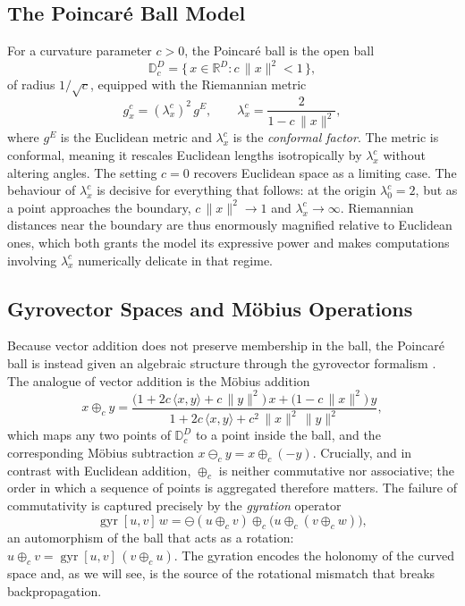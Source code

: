\documentclass[12pt]{report}
\begin{document}
\subsection{The Poincar\'e Ball Model}
For a curvature parameter $c > 0$, the Poincar\'e ball is the open ball
\begin{equation}
    \mathbb{D}_c^D = \big\{\, x \in \mathbb{R}^D : c\,\|x\|^2 < 1 \,\big\},
\end{equation}
of radius $1/\sqrt{c}$, equipped with the Riemannian metric
\begin{equation}
    \label{eq:bg_metric}
    g_x^c = (\lambda_x^c)^2\, g^E,
    \qquad
    \lambda_x^c = \frac{2}{1 - c\,\|x\|^2},
\end{equation}
where $g^E$ is the Euclidean metric and $\lambda_x^c$ is the \emph{conformal factor}. The metric is conformal, meaning it rescales Euclidean lengths isotropically by $\lambda_x^c$ without altering angles. The setting $c=0$ recovers Euclidean space as a limiting case. The behaviour of $\lambda_x^c$ is decisive for everything that follows: at the origin $\lambda_0^c = 2$, but as a point approaches the boundary, $c\,\|x\|^2 \to 1$ and $\lambda_x^c \to \infty$. Riemannian distances near the boundary are thus enormously magnified relative to Euclidean ones, which both grants the model its expressive power and makes computations involving $\lambda_x^c$ numerically delicate in that regime.

\subsection{Gyrovector Spaces and M\"obius Operations}
Because vector addition does not preserve membership in the ball, the Poincar\'e ball is instead given an algebraic structure through the gyrovector formalism \cite{ungar2009gyrovector}. The analogue of vector addition is the M\"obius addition
\begin{equation}
    \label{eq:bg_mobius_add}
    x \oplus_c y = \frac{\big(1 + 2c\,\langle x, y\rangle + c\,\|y\|^2\big)\,x + \big(1 - c\,\|x\|^2\big)\,y}{1 + 2c\,\langle x, y\rangle + c^2\,\|x\|^2\,\|y\|^2},
\end{equation}
which maps any two points of $\mathbb{D}_c^D$ to a point inside the ball, and the corresponding M\"obius subtraction $x \ominus_c y = x \oplus_c (-y)$. Crucially, and in contrast with Euclidean addition, $\oplus_c$ is neither commutative nor associative; the order in which a sequence of points is aggregated therefore matters. The failure of commutativity is captured precisely by the \emph{gyration} operator
\begin{equation}
    \label{eq:bg_gyration}
    \operatorname{gyr}[u, v]\,w = \ominus(u \oplus_c v) \oplus_c \big(u \oplus_c (v \oplus_c w)\big),
\end{equation}
an automorphism of the ball that acts as a rotation: $u \oplus_c v = \operatorname{gyr}[u, v]\,(v \oplus_c u)$. The gyration encodes the holonomy of the curved space and, as we will see, is the source of the rotational mismatch that breaks backpropagation.
\end{document}
